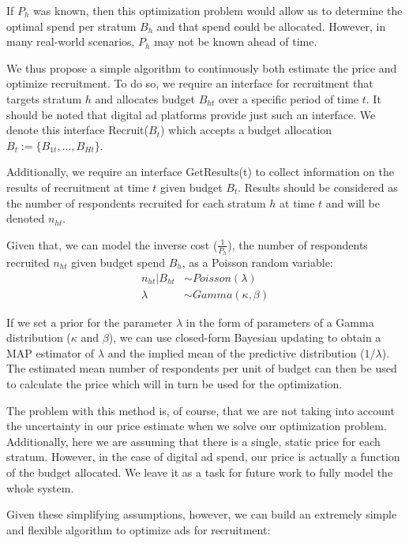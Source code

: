 \documentclass[a4paper,12pt]{article}
\theoremstyle{proposition}
\begin{document}
If $P_h$ was known, then this optimization problem would allow us to determine the optimal spend per stratum $B_h$ and that spend could be allocated. However, in many real-world scenarios, $P_h$ may not be known ahead of time.

We thus propose a simple algorithm to continuously both estimate the price and optimize recruitment. To do so, we require an interface for recruitment that targets stratum $h$ and allocates budget $B_{ht}$ over a specific period of time $t$. It should be noted that digital ad platforms provide just such an interface. We denote this interface Recruit($B_{t}$) which accepts a budget allocation $B_t := \{B_{1t},...,B_{Ht}\}$.

Additionally, we require an interface GetResults(t) to collect information on the results of recruitment at time $t$ given budget $B_t$. Results should be considered as the number of respondents recruited for each stratum $h$ at time $t$ and will be denoted $n_{ht}$.

Given that, we can model the inverse cost ($\frac{1}{P_h}$), the number of respondents recruited $n_{ht}$ given budget spend $B_h$, as a Poisson random variable:
%
\begin{align*}
n_{ht} | B_{ht} &\sim Poisson(\lambda) \\
\lambda &\sim Gamma(\kappa, \beta)
\end{align*}

If we set a prior for the parameter $\lambda$ in the form of parameters of a Gamma distribution ($\kappa$ and $\beta$), we can use closed-form Bayesian updating to obtain a MAP estimator of $\lambda$ and the implied mean of the predictive distribution ($ 1 / \lambda$). The estimated mean number of respondents per unit of budget can then be used to calculate the price which will in turn be used for the optimization.

The problem with this method is, of course, that we are not taking into account the uncertainty in our price estimate when we solve our optimization problem. Additionally, here we are assuming that there is a single, static price for each stratum. However, in the case of digital ad spend, our price is actually a function of the budget allocated. We leave it as a task for future work to fully model the whole system.

Given these simplifying assumptions, however, we can build an extremely simple and flexible algorithm to optimize ads for recruitment:
\end{document}
